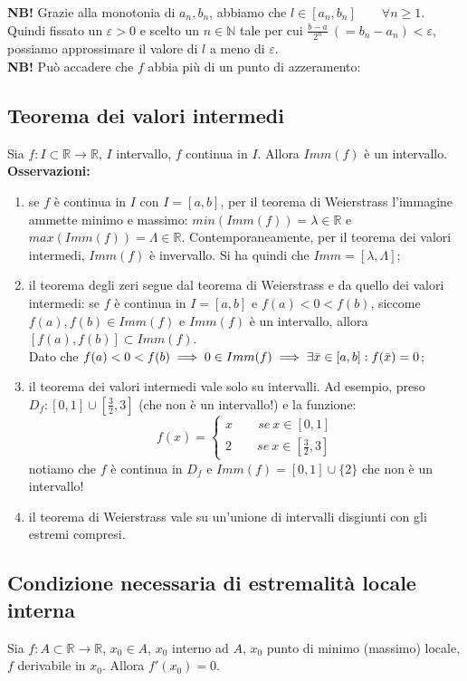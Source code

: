\documentclass{article}
\begin{document}
\noindent\textbf{NB!} Grazie alla monotonia di $a_n, b_n$, abbiamo che $l \in [a_n, b_n] \qquad \forall n \geq 1$. Quindi fissato un $\varepsilon > 0$ e scelto un $n \in \mathbb{N}$ tale per cui $\frac{b - a}{2^n} \ (= b_n - a_n) < \varepsilon$, possiamo approssimare il valore di $l$ a meno di $\varepsilon$.\\

\noindent\textbf{NB!} Può accadere che $f$ abbia più di un punto di azzeramento: 

\subsection{Teorema dei valori intermedi}
Sia $f: I \subset \mathbb{R} \xrightarrow{} \mathbb{R}$, $I$ intervallo, $f$ continua in $I$. Allora $Imm(f)$ è un intervallo.\\

\noindent\textbf{Osservazioni:}
\begin{enumerate}
  \item se $f$ è continua in $I$ con $I = [a, b]$, per il teorema di Weierstrass l'immagine ammette minimo e massimo: $min(Imm(f)) = \lambda \in \mathbb{R}$ e $max(Imm(f)) = \Lambda \in \mathbb{R}$. Contemporaneamente, per il teorema dei valori intermedi, $Imm(f)$ è invervallo. Si ha quindi che $Imm = [\lambda, \Lambda]$;
  \item il teorema degli zeri segue dal teorema di Weierstrass e da quello dei valori intermedi: se $f$ è continua in $I = [a, b]$ e $f(a) < 0 < f(b)$, siccome $f(a), f(b) \in Imm(f)$ e $Imm(f)$ è un intervallo, allora $[f(a), f(b)] \subset Imm(f)$. \\
  Dato che $f(a) < 0 < f(b) \implies 0 \in Imm(f) \implies \exists \Bar{x} \in [a, b] : f(\Bar{x}) = 0$;
  \item il teorema dei valori intermedi vale solo su intervalli. Ad esempio, preso $D_f: [0, 1] \cup [\frac{3}{2}, 3]$ (che non è un intervallo!) e la funzione:
  $$f(x) = \begin{cases}
    x \qquad se \ x \in [0, 1] \\
    2 \qquad se \ x \in [\frac{3}{2}, 3]
  \end{cases}$$ 
  notiamo che $f$ è continua in $D_f$ e $Imm(f) = [0, 1] \cup \{2\}$ che non è un intervallo!
  \item il teorema di Weierstrass vale su un'unione di intervalli disgiunti con gli estremi compresi.
\end{enumerate}

\subsection{Condizione necessaria di estremalità locale interna}
Sia $f: A \subset \mathbb{R} \xrightarrow{} \mathbb{R}$, $x_0 \in A$, $x_0$ interno ad $A$, $x_0$ punto di minimo (massimo) locale, $f$ derivabile in $x_0$. Allora $f'(x_0) = 0$.
\end{document}
